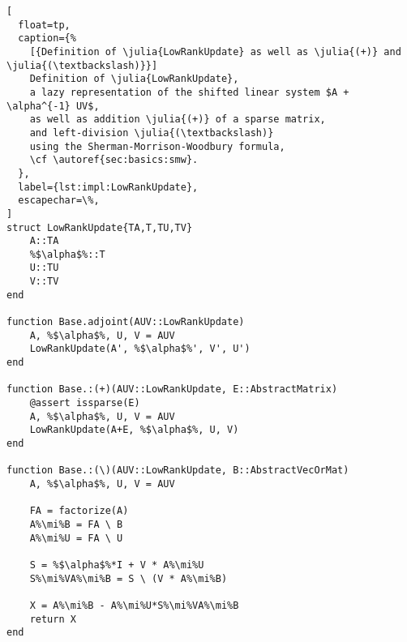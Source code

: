\def\mi{\textsuperscript{-1}}
\begin{lstlisting}[
  float=tp,
  caption={%
    [{Definition of \julia{LowRankUpdate} as well as \julia{(+)} and \julia{(\textbackslash)}}]
    Definition of \julia{LowRankUpdate},
    a lazy representation of the shifted linear system $A + \alpha^{-1} UV$,
    as well as addition \julia{(+)} of a sparse matrix,
    and left-division \julia{(\textbackslash)}
    using the Sherman-Morrison-Woodbury formula,
    \cf \autoref{sec:basics:smw}.
  },
  label={lst:impl:LowRankUpdate},
  escapechar=\%,
]
struct LowRankUpdate{TA,T,TU,TV}
    A::TA
    %$\alpha$%::T
    U::TU
    V::TV
end

function Base.adjoint(AUV::LowRankUpdate)
    A, %$\alpha$%, U, V = AUV
    LowRankUpdate(A', %$\alpha$%', V', U')
end

function Base.:(+)(AUV::LowRankUpdate, E::AbstractMatrix)
    @assert issparse(E)
    A, %$\alpha$%, U, V = AUV
    LowRankUpdate(A+E, %$\alpha$%, U, V)
end

function Base.:(\)(AUV::LowRankUpdate, B::AbstractVecOrMat)
    A, %$\alpha$%, U, V = AUV

    FA = factorize(A)
    A%\mi%B = FA \ B
    A%\mi%U = FA \ U

    S = %$\alpha$%*I + V * A%\mi%U
    S%\mi%VA%\mi%B = S \ (V * A%\mi%B)

    X = A%\mi%B - A%\mi%U*S%\mi%VA%\mi%B
    return X
end
\end{lstlisting}


